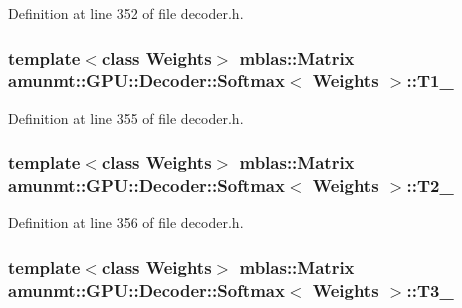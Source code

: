Definition at line 352 of file decoder.\+h.

\subsubsection[{\texorpdfstring{T1\+\_\+}{T1_}}]{\setlength{\rightskip}{0pt plus 5cm}template$<$class Weights$>$ {\bf mblas\+::\+Matrix} {\bf amunmt\+::\+G\+P\+U\+::\+Decoder\+::\+Softmax}$<$ {\bf Weights} $>$\+::T1\+\_\+\hspace{0.3cm}{\ttfamily [private]}}\hypertarget{classamunmt_1_1GPU_1_1Decoder_1_1Softmax_a8a139447e51633e488a436440b21ffe9}{}\label{classamunmt_1_1GPU_1_1Decoder_1_1Softmax_a8a139447e51633e488a436440b21ffe9}


Definition at line 355 of file decoder.\+h.

\subsubsection[{\texorpdfstring{T2\+\_\+}{T2_}}]{\setlength{\rightskip}{0pt plus 5cm}template$<$class Weights$>$ {\bf mblas\+::\+Matrix} {\bf amunmt\+::\+G\+P\+U\+::\+Decoder\+::\+Softmax}$<$ {\bf Weights} $>$\+::T2\+\_\+\hspace{0.3cm}{\ttfamily [private]}}\hypertarget{classamunmt_1_1GPU_1_1Decoder_1_1Softmax_a81f4a316db17da624e59deaf9bf72951}{}\label{classamunmt_1_1GPU_1_1Decoder_1_1Softmax_a81f4a316db17da624e59deaf9bf72951}


Definition at line 356 of file decoder.\+h.

\subsubsection[{\texorpdfstring{T3\+\_\+}{T3_}}]{\setlength{\rightskip}{0pt plus 5cm}template$<$class Weights$>$ {\bf mblas\+::\+Matrix} {\bf amunmt\+::\+G\+P\+U\+::\+Decoder\+::\+Softmax}$<$ {\bf Weights} $>$\+::T3\+\_\+\hspace{0.3cm}{\ttfamily [private]}}\hypertarget{classamunmt_1_1GPU_1_1Decoder_1_1Softmax_a21a82df071c85202f529b7c87b5b597c}{}\label{classamunmt_1_1GPU_1_1Decoder_1_1Softmax_a21a82df071c85202f529b7c87b5b597c}


